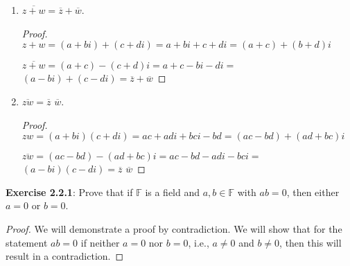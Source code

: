 \documentclass[a4paper]{article}
\begin{document}
\begin{myparindent}{0pt}
\begin{enumerate}[label=(\roman*)]
\begin{proof}
        $z + \overline{z} = (a + bi) + (a - bi) = 2a + bi - bi = 2a$ \newline

        Because $2 \in \mathbb{R}$ and $a \in \mathbb{R}$, and real numbers are
        closed under multiplication, $2a$ is also real, therefore
        $z + \overline{z}$ is real. \newline

        Next, we will prove that $z - \overline{z}$ is imaginary. \newline
        $z - \overline{z} = (a + bi) - (a - bi) = a - a + bi + bi = 2bi$. \newline

        Because $2 \in \mathbb{R}$ and $b \in \mathbb{R}$, and real numbers
        are closed under multiplication, then $2b \in \mathbb{R}$. Imaginary
        numbers are the set $\{ ci | c \in \mathbb{R} \}$. We can see that
        $2bi \in \{ ci | c \in \mathbb{R} \}$, therefore $z - \overline{z}$
        is imaginary.
    \end{proof}

  \item $\overline{z + w} = \overline{z} + \overline{w}$.
    \begin{proof}
        $z + w = (a + bi) + (c + di) = a + bi + c + di = (a + c) + (b + d)i$ \newline

        $\overline{z + w} = (a + c)- (c + d)i = a + c - bi - di = $
        $(a - bi) + (c - di) = \overline{z} + \overline{w}$
    \end{proof}

  \item $\overline{zw} = \overline{z}$ $\overline{w}$.
    \begin{proof}
        $zw = (a + bi)(c + di) = ac + adi + bci -bd = (ac - bd) + (ad + bc)i$ \newline

        $\overline{zw} = (ac - bd) - (ad + bc)i = ac - bd - adi - bci =$ \newline
        $(a - bi)(c - di) = \overline{z}$ $\overline{w}$
    \end{proof}
\end{enumerate}

\textbf{Exercise 2.2.1}:
Prove that if $\mathbb{F}$ is a field and $a, b \in \mathbb{F}$ with $ab = 0$,
then either $a = 0$ or $b = 0$.

\begin{proof}
  We will demonstrate a proof by contradiction. We will show that for the
  statement $ab = 0$ if neither $a = 0$ nor $b = 0$, i.e.,
  $a \ne 0$ and $b \ne 0$, then this will result in a contradiction. \newline


\end{proof}
\end{myparindent}
\end{document}
